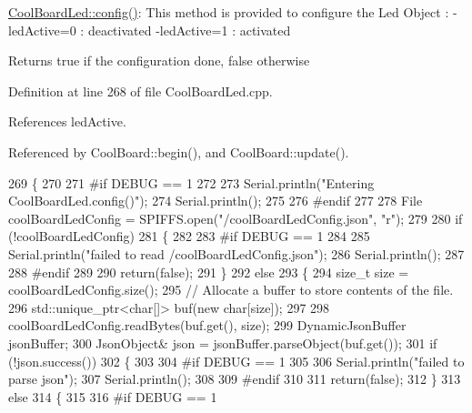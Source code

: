 \hyperlink{classCoolBoardLed_a1b60e5e30bea96c49ed62ed1bf1ffc8b}{Cool\+Board\+Led\+::config()}\+: This method is provided to configure the Led Object \+: -\/led\+Active=0 \+: deactivated -\/led\+Active=1 \+: activated \begin{DoxyReturn}{Returns}
true if the configuration done, false otherwise 
\end{DoxyReturn}


Definition at line 268 of file Cool\+Board\+Led.\+cpp.



References led\+Active.



Referenced by Cool\+Board\+::begin(), and Cool\+Board\+::update().


\begin{DoxyCode}
269 \{
270 
271 \textcolor{preprocessor}{#if DEBUG == 1 }
272         
273     Serial.println(\textcolor{stringliteral}{"Entering CoolBoardLed.config()"});
274     Serial.println();
275 
276 \textcolor{preprocessor}{#endif}
277     
278     File coolBoardLedConfig = SPIFFS.open(\textcolor{stringliteral}{"/coolBoardLedConfig.json"}, \textcolor{stringliteral}{"r"});
279 
280     \textcolor{keywordflow}{if} (!coolBoardLedConfig) 
281     \{
282     
283 \textcolor{preprocessor}{    #if DEBUG == 1}
284 
285         Serial.println(\textcolor{stringliteral}{"failed to read /coolBoardLedConfig.json"});
286         Serial.println();
287 
288 \textcolor{preprocessor}{    #endif}
289 
290         \textcolor{keywordflow}{return}(\textcolor{keyword}{false});
291     \}
292     \textcolor{keywordflow}{else}
293     \{
294         \textcolor{keywordtype}{size\_t} size = coolBoardLedConfig.size();
295         \textcolor{comment}{// Allocate a buffer to store contents of the file.}
296         std::unique\_ptr<char[]> buf(\textcolor{keyword}{new} \textcolor{keywordtype}{char}[size]);
297 
298         coolBoardLedConfig.readBytes(buf.get(), size);
299         DynamicJsonBuffer jsonBuffer;
300         JsonObject& json = jsonBuffer.parseObject(buf.get());
301         \textcolor{keywordflow}{if} (!json.success()) 
302         \{
303         
304 \textcolor{preprocessor}{        #if DEBUG == 1}
305 
306             Serial.println(\textcolor{stringliteral}{"failed to parse json"});
307             Serial.println();
308         
309 \textcolor{preprocessor}{        #endif}
310 
311             \textcolor{keywordflow}{return}(\textcolor{keyword}{false});
312         \} 
313         \textcolor{keywordflow}{else}
314         \{
315         
316 \textcolor{preprocessor}{        #if DEBUG == 1}

\end{DoxyCode}
